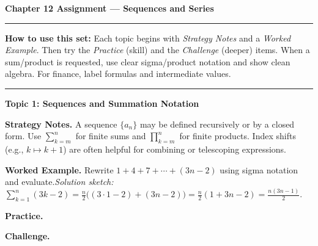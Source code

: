 \documentclass[12pt]{exam}
\newcommand{\examtitle}{Chapter 12 Assignment --- Sequences and Series}
\newcommand{\instructions}{
    \noindent\rule{\textwidth}{0.5pt}
    \begin{center}
    \textbf{How to use this set:} Each topic begins with \emph{Strategy Notes} and a \emph{Worked Example}. Then try the \emph{Practice} (skill) and the \emph{Challenge} (deeper) items. When a sum/product is requested, use clear sigma/product notation and show clean algebra. For finance, label formulas and intermediate values.
    \end{center}
    \noindent\rule{\textwidth}{0.5pt}
}
\newlength{\partskip}
\newcommand{\partspace}{\vspace*{\partskip}}
\begin{document}
\begin{center}
\textbf{\Large \examtitle} \\
\vspace{0.5cm}
\hspace{0.1\textwidth}
\end{center}

\instructions
\vspace{0.5cm}

\begin{questions}

\question
\textbf{Topic 1: Sequences and Summation Notation}

\textbf{Strategy Notes.} A sequence $\{a_n\}$ may be defined recursively or by a closed form. Use $\displaystyle\sum_{k=m}^{n}$ for finite sums and $\displaystyle\prod_{k=m}^{n}$ for finite products. Index shifts (e.g., $k\mapsto k+1$) are often helpful for combining or telescoping expressions.

\textbf{Worked Example.} Rewrite $1+4+7+\cdots+(3n-2)$ using sigma notation and evaluate.\quad\emph{Solution sketch:} $\displaystyle\sum_{k=1}^{n}(3k-2)=\tfrac{n}{2}\bigl((3\cdot1-2)+(3n-2)\bigr)=\tfrac{n}{2}(1+3n-2)=\tfrac{n(3n-1)}{2}$.

\textbf{Practice.}

\newpage
\textbf{Challenge.}


\end{questions}
\end{document}
